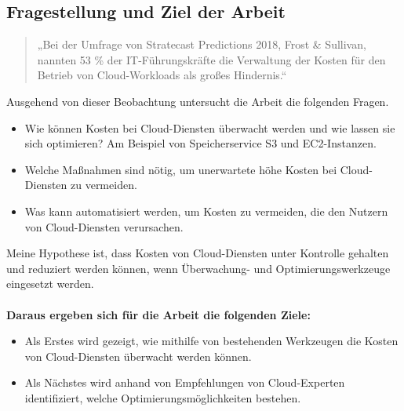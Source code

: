 \subsection{Fragestellung und Ziel der Arbeit}
\begin{quote}
„Bei der Umfrage von Stratecast Predictions 2018, Frost \& Sullivan, nannten 53 \% der IT-Führungskräfte die Verwaltung der Kosten für den Betrieb von Cloud-Workloads als großes Hindernis.“  
{\cite{SP1}}
\end{quote}

\begin{flushleft}
Ausgehend von dieser Beobachtung untersucht die Arbeit die folgenden Fragen. 
\end{flushleft}

\begin{itemize}
    \item
        Wie können Kosten bei Cloud-Diensten überwacht werden und wie lassen sie sich optimieren? 
        Am Beispiel von Speicherservice S3 und EC2-Instanzen.
    \item
        Welche Maßnahmen sind nötig, um unerwartete höhe Kosten bei Cloud-Diensten zu vermeiden.
    \item 
        Was kann automatisiert werden, um Kosten zu vermeiden, die den Nutzern von Cloud-Diensten verursachen.  
\end{itemize}
Meine Hypothese ist, dass Kosten von Cloud-Diensten unter Kontrolle gehalten und
reduziert werden können, wenn Überwachung- und Optimierungswerkzeuge eingesetzt werden.
\\\\

\newpage
\textbf{Daraus ergeben sich für die Arbeit die folgenden Ziele:}\\ 
\begin{itemize}
    \item
        Als Erstes wird gezeigt, wie mithilfe von bestehenden Werkzeugen  die Kosten von Cloud-Diensten überwacht werden können.\\
    \item
        Als Nächstes wird anhand von Empfehlungen von Cloud-Experten identifiziert, welche Optimierungsmöglichkeiten bestehen.\\
\end{itemize}

